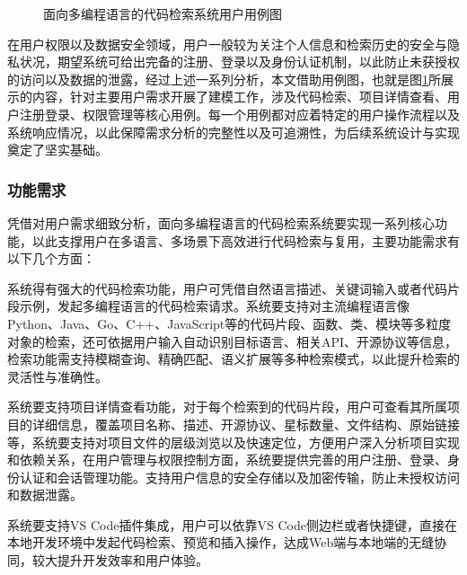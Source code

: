 \documentclass[UTF8,a4paper,12pt]{ctexart}
\numberwithin{equation}{section}
\begin{document}
\begin{figure}[H]
	\caption{面向多编程语言的代码检索系统用户用例图}
	\label{usecase}
\end{figure}
在用户权限以及数据安全领域，用户一般较为关注个人信息和检索历史的安全与隐私状况，期望系统可给出完备的注册、登录以及身份认证机制，以此防止未获授权的访问以及数据的泄露，经过上述一系列分析，本文借助用例图，也就是图\ref{usecase}所展示的内容，针对主要用户需求开展了建模工作，涉及代码检索、项目详情查看、用户注册登录、权限管理等核心用例。每一个用例都对应着特定的用户操作流程以及系统响应情况，以此保障需求分析的完整性以及可追溯性，为后续系统设计与实现奠定了坚实基础。\par
\subsubsection{功能需求}
凭借对用户需求细致分析，面向多编程语言的代码检索系统要实现一系列核心功能，以此支撑用户在多语言、多场景下高效进行代码检索与复用，主要功能需求有以下几个方面：\par
系统得有强大的代码检索功能，用户可凭借自然语言描述、关键词输入或者代码片段示例，发起多编程语言的代码检索请求。系统要支持对主流编程语言像Python、Java、Go、C++、JavaScript等的代码片段、函数、类、模块等多粒度对象的检索，还可依据用户输入自动识别目标语言、相关API、开源协议等信息，检索功能需支持模糊查询、精确匹配、语义扩展等多种检索模式，以此提升检索的灵活性与准确性。\par
系统要支持项目详情查看功能，对于每个检索到的代码片段，用户可查看其所属项目的详细信息，覆盖项目名称、描述、开源协议、星标数量、文件结构、原始链接等，系统要支持对项目文件的层级浏览以及快速定位，方便用户深入分析项目实现和依赖关系，在用户管理与权限控制方面，系统要提供完善的用户注册、登录、身份认证和会话管理功能。支持用户信息的安全存储以及加密传输，防止未授权访问和数据泄露。\par
系统要支持VS Code插件集成，用户可以依靠VS Code侧边栏或者快捷键，直接在本地开发环境中发起代码检索、预览和插入操作，达成Web端与本地端的无缝协同，较大提升开发效率和用户体验。\par
\end{document}

